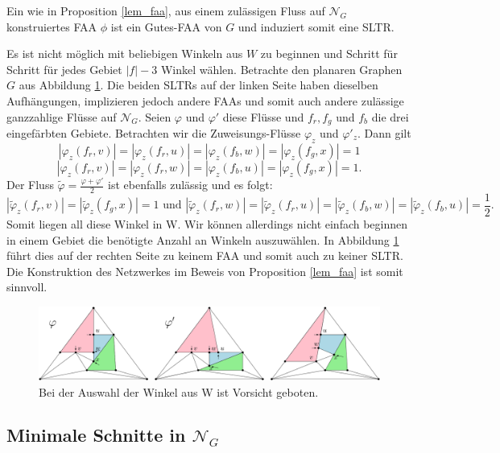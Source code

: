 \begin{conjecture}\label{conj_faa}
Ein wie in Proposition \ref{lem_faa}, aus einem zulässigen Fluss auf $\mathcal{N}_G$ konstruiertes FAA $\phi$ ist ein Gutes-FAA von $G$ und induziert somit eine SLTR.
\end{conjecture}

\begin{example}
Es ist nicht möglich mit beliebigen Winkeln aus $W$ zu beginnen und Schritt für Schritt für jedes Gebiet $|f|-3$ Winkel wählen. Betrachte den planaren Graphen $G$ aus Abbildung \ref{lem_faa_choice_ex}. Die beiden SLTRs auf der linken Seite haben dieselben Aufhängungen, implizieren jedoch andere FAAs und somit auch andere zulässige ganzzahlige Flüsse auf $\mathcal{N}_G$. Seien $\varphi$ und $\varphi'$ diese Flüsse und $f_{r},f_{g}$ und $f_b$ die drei eingefärbten Gebiete. Betrachten wir die Zuweisungs-Flüsse $\varphi_z$ und $\varphi'_z$. Dann gilt $$|\varphi_z(f_r,v)|=|\varphi_z(f_r,u)|=|\varphi_z(f_b,w)| = |\varphi_z(f_g,x)| = 1$$
$$|\varphi_z(f_r,v)|=|\varphi_z(f_r,w)|=|\varphi_z(f_b,u)| = |\varphi_z(f_g,x)| = 1.$$
Der Fluss $\tilde{\varphi}=\frac{\varphi+\varphi'}{2}$ ist ebenfalls zulässig und es folgt:
$$|\tilde{\varphi}_z(f_r,v)|=|\tilde{\varphi}_z(f_g,x)| = 1 \text{ und } |\tilde{\varphi}_z(f_r,w)|=|\tilde{\varphi}_z(f_r,u)| = |\tilde{\varphi}_z(f_b,w)|=|\tilde{\varphi}_z(f_b,u)| = \frac{1}{2}.$$
Somit liegen all diese Winkel in W. Wir können allerdings nicht einfach beginnen in einem Gebiet die benötigte Anzahl an Winkeln auszuwählen. In Abbildung \ref{lem_faa_choice_ex} führt dies auf der rechten Seite zu keinem FAA und somit auch zu keiner SLTR. Die Konstruktion des Netzwerkes im Beweis von Proposition \ref{lem_faa} ist somit sinnvoll.

\begin{figure}[h]
\centering
\includegraphics[width=1\textwidth]{lem_faa_choice_ex.png}
\caption{Bei der Auswahl der Winkel aus W ist Vorsicht geboten.}
\label{lem_faa_choice_ex}
\end{figure}
\end{example}

\subsection{Minimale Schnitte in $\mathcal{N}_G$}


